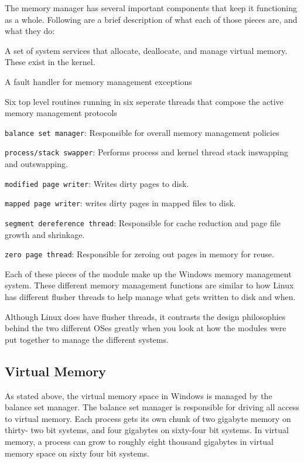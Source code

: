   The memory manager has several important components that keep it functioning as a
  whole. Following are a brief description of what each of those pieces are, and what
  they do: \cite{internals2}
  \begin{description}
	  \item A set of system services that allocate, deallocate, and manage virtual
		  memory. These exist in the kernel.
	  \item A fault handler for memory management exceptions
	  \item Six top level routines running in six seperate threads that compose
		  the active memory management protocols

		  \begin{description}
			  \item \texttt{balance set manager}: Responsible for overall
				  memory management policies
			  \item \texttt{process/stack swapper}: Performs process and
				  kernel thread stack inswapping and outswapping.
			  \item \texttt{modified page writer}: Writes dirty pages to
				  disk.
			  \item \texttt{mapped page writer}: writes dirty pages in
				  mapped files to disk.
			  \item \texttt{segment dereference thread}: Responsible for
				  cache reduction and page file growth and shrinkage.
			  \item \texttt{zero page thread}: Responsible for zeroing
				  out pages in memory for reuse.
		  \end{description}
  \end{description}
  Each of these pieces of the module make up the Windows memory management system.
  These different memory management functions are similar to how Linux has different
  flusher threads to help manage what gets written to disk and when.

  Although Linux does have flusher threads, it contrasts the design philosophies behind
  the two different OSes greatly when you look at how the modules were put together to
  manage the different systems.

  \subsection{Virtual Memory}
	As stated above, the virtual memory space in Windows is managed by the balance
	set manager. The balance set manager is responsible for driving all access
	to virtual memory. Each process gets its own chunk of two gigabyte memory on thirty-
	two bit systems, and four gigabytes on sixty-four bit systems. In virtual memory,
	a process can grow to roughly eight thousand gigabytes in virtual memory space on
	sixty four bit systems.\cite{internals2}

